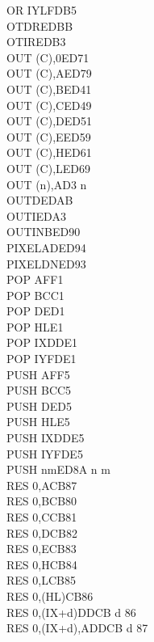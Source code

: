 \begin{multicols}{3}
{\begin{tabbing}
        OR IYL\UNDOC\>FDB5\\
        OTDR\>EDBB\\
        OTIR\>EDB3\\
        OUT (C),0\UNDOC\>ED71\\
        OUT (C),A\>ED79\\
        OUT (C),B\>ED41\\
        OUT (C),C\>ED49\\
        OUT (C),D\>ED51\\
        OUT (C),E\>ED59\\
        OUT (C),H\>ED61\\
        OUT (C),L\>ED69\\
        OUT (n),A\>D3 n\\
        OUTD\>EDAB\\
        OUTI\>EDA3\\
        OUTINB\ZXN\>ED90\\
        PIXELAD\ZXN\>ED94\\
        PIXELDN\ZXN\>ED93\\
        POP AF\>F1\\
        POP BC\>C1\\
        POP DE\>D1\\
        POP HL\>E1\\
        POP IX\>DDE1\\
        POP IY\>FDE1\\
        PUSH AF\>F5\\
        PUSH BC\>C5\\
        PUSH DE\>D5\\
        PUSH HL\>E5\\
        PUSH IX\>DDE5\\
        PUSH IY\>FDE5\\
        PUSH nm\ZXN\>ED8A n m\\
        RES 0,A\>CB87\\
        RES 0,B\>CB80\\
        RES 0,C\>CB81\\
        RES 0,D\>CB82\\
        RES 0,E\>CB83\\
        RES 0,H\>CB84\\
        RES 0,L\>CB85\\
        RES 0,(HL)\>CB86\\
        RES 0,(IX+d)\>DDCB d 86\\
        RES 0,(IX+d),A\UNDOC\>DDCB d 87\\

\end{tabbing}}
\end{multicols}
